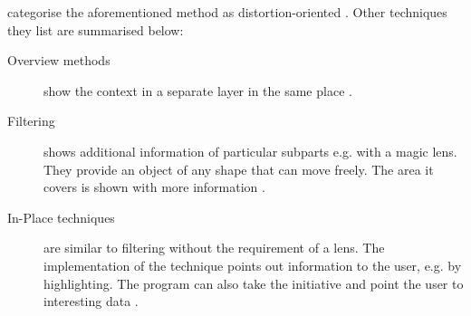 \citeauthor{Kosara2003} categorise the aforementioned method as distortion-oriented . Other techniques they list are summarised below:
\begin{description}
\item[Overview methods] show the context in a separate layer in the same place .
\item[Filtering] shows additional information of particular subparts e.g. with a magic lens. They provide an object of any shape that can move freely. The area it covers is shown with more information .
\item[In-Place techniques] are similar to filtering without the requirement of a lens. The implementation of the technique points out information to the user, e.g. by highlighting. The program can also take the initiative and point the user to interesting data .
\end{description}
